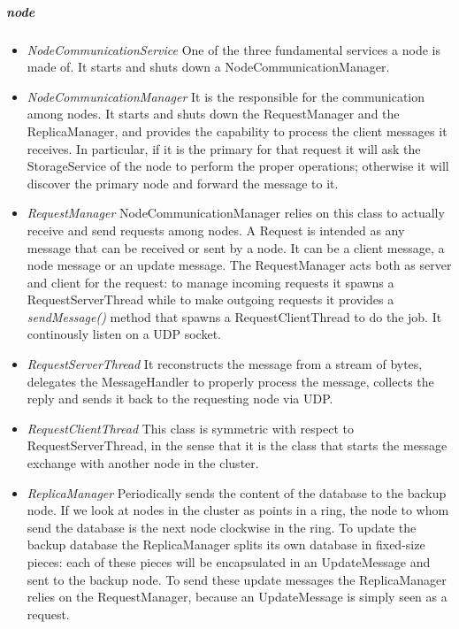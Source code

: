 \documentclass{article}
\begin{document}
\subparagraph{node} 
\begin{itemize}
\item \textit{NodeCommunicationService} One of the three fundamental services a node is made of. It starts and shuts down a NodeCommunicationManager.
\item \textit{NodeCommunicationManager} It is the responsible for the communication among nodes. It starts and shuts down the RequestManager and the ReplicaManager, and provides the capability to process the client messages it receives. In particular, if it is the primary for that request it will ask the StorageService of the node to perform the proper operations; otherwise it will discover the primary node and forward the message to it.
\item \textit{RequestManager} NodeCommunicationManager relies on this class to actually receive and send requests among nodes. A Request is intended as any message that can be received or sent by a node. It can be a client message, a node message or an update message. The RequestManager acts both as server and client for the request: to manage incoming requests it spawns a RequestServerThread while to make outgoing requests it provides a \textit{sendMessage()} method that spawns a RequestClientThread to do the job. It continously listen on a UDP socket.
\item \textit{RequestServerThread} It reconstructs the message from a stream of bytes, delegates the MessageHandler to properly process the message, collects the reply and sends it back to the requesting node via UDP.
\item \textit{RequestClientThread} This class is symmetric with respect to RequestServerThread, in the sense that it is the class that starts the message exchange with another node in the cluster.
\item \textit{ReplicaManager} Periodically sends the content of the database to the backup node. If we look at nodes in the cluster as points in a ring, the node to whom send the database is the next node clockwise in the ring. To update the backup database the ReplicaManager splits its own database in fixed-size pieces: each of these pieces will be encapsulated in an UpdateMessage and sent to the backup node. To send these update messages the ReplicaManager relies on the RequestManager, because an UpdateMessage is simply seen as a request.
\end{itemize}
\end{document}
